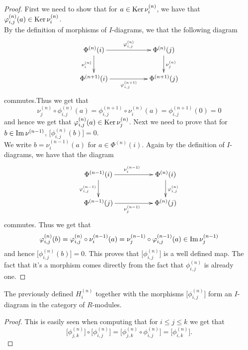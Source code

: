 \documentclass[11pt, a4paper, twoside]{article}
\begin{document}
\begin{proof}
    First we need to show that for $a\in \mathrm{Ker}\thinspace\nu^{(n)}_i$, we have that $\phi^{(n)}_{i,j}(a)\in \mathrm{Ker}\thinspace\nu^{(n)}_i$.\\
    By the definition of morphisms of $I$-diagrams, we that the following diagram
    \begin{displaymath}
        \xymatrix{
            \Phi^{(n)}(i)\ar[rr]^{\phi^{(n)}_{i,j}}\ar[d]_{\nu^{(n)}_i} & & \Phi^{(n)}(j)\ar[d]^{\nu^{(n)}_j}\\
            \Phi^{(n+1)}(i)\ar[rr]_{\phi^{(n+1)}_{i,j}} & & \Phi^{(n+1)}(j)
        }
    \end{displaymath}
    commutes.Thus we get that 
    \begin{displaymath}
        \nu^{(n)}_j\circ\phi^{(n)}_{i,j}(a)=\phi^{(n+1)}_{i,j}\circ\nu^{(n)}_i(a)=\phi^{(n+1)}_{i,j}(0)=0
    \end{displaymath}
    and hence we get that $\phi^{(n)}_{i,j}(a)\in \mathrm{Ker}\thinspace\nu^{(n)}_j$. Next we need to prove that for $b\in \mathrm{Im}\thinspace\nu^{(n-1)}$, $\Big[\phi^{(n)}_{i,j}(b)\Big]=0$.\\
    We write $b=\nu^{(n-1)}_i(a)$ for $a\in\Phi^{(n)}(i)$. Again by the definition of $I$-diagrams, we have that the diagram
    \begin{displaymath}
        \xymatrix{
            \Phi^{(n-1)}(i)\ar[rr]^{\nu^{(n-1)}_i}\ar[d]_{\phi^{(n-1)}_{i,j}} & & \Phi^{(n)}(i)\ar[d]^{\phi^{(n)}_{i,j}}\\
            \Phi^{(n-1)}(j)\ar[rr]_{\nu^{(n-1)}_j} & & \Phi^{(n)}(j)
        }        
    \end{displaymath}
    commutes. Thus we get that 
    \begin{displaymath}
        \phi^{(n)}_{i,j}(b)=\phi^{(n)}_{i,j}\circ\nu^{(n-1)}_i(a)=\nu^{(n-1)}_j\circ\phi^{(n-1)}_{i,j}(a)\in \mathrm{Im}\thinspace\nu^{(n-1)}_j
    \end{displaymath}
    and hence $\Big[\phi^{(n)}_{i,j}(b)\Big]=0$. This proves that $\Big[\phi^{(n)}_{i,j}\Big]$ is a well defined map. The fact that it's a morphism comes directly from the fact that $\phi^{(n)}_{i,j}$ is already one.
\end{proof}
\begin{prop}
The previously defined $H^{(n)}_i$ together with the morphisms $\Big[\phi^{(n)}_{i,j}\Big]$ form an $I$-diagram in the category of $R$-modules.
\end{prop}
\begin{proof}
    This is easily seen when computing that for $i\leq j\leq k$ we get that
    \begin{displaymath}
        \Big[\phi^{(n)}_{j,k}\Big]\circ\Big[\phi^{(n)}_{i,j}\Big]=\Big[\phi^{(n)}_{j,k}\circ\phi^{(n)}_{i,j}\Big]=\Big[\phi^{(n)}_{i,k}\Big].
    \end{displaymath}
\end{proof}
\end{document}
